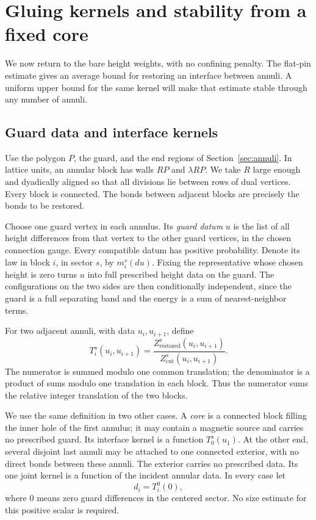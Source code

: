 \section{Gluing kernels and stability from a fixed core}\label{sec:kernels}

We now return to the bare height weights, with no confining penalty.
The flat-pin estimate gives an average bound for restoring an interface
between annuli. A uniform upper bound for the same kernel will make
that estimate stable through any number of annuli.

\subsection{Guard data and interface kernels}

Use the polygon \(P\), the guard, and the end regions of
Section~\ref{sec:annuli}. In lattice units, an annular block has walls
\(RP\) and \(\lambda RP\). We take \(R\) large enough and dyadically
aligned so that all divisions lie between rows of dual vertices.
Every block is connected. The bonds between adjacent blocks are
precisely the bonds to be restored.

Choose one guard vertex in each annulus. Its \emph{guard datum}
\(u\) is the list of all height differences from that vertex to the
other guard vertices, in the chosen connection gauge. Every
compatible datum has positive probability. Denote its law in block
\(i\), in sector \(s\), by \(m_i^s(du)\). Fixing the representative
whose chosen height is zero turns \(u\) into full prescribed height
data on the guard. The configurations on the two sides are then
conditionally independent, since the guard is a full separating
band and the energy is a sum of nearest-neighbor terms.

For two adjacent annuli, with data \(u_i,u_{i+1}\), define
\[
 T_i^s(u_i,u_{i+1})
   =\frac{Z_{\mathrm{restored}}^s(u_i,u_{i+1})}
           {Z_{\mathrm{cut}}^s(u_i,u_{i+1})}.
\]
The numerator is summed modulo one common translation; the
denominator is a product of sums modulo one translation in each
block. Thus the numerator sums the relative integer translation
of the two blocks.

We use the same definition in two other cases. A \emph{core} is
a connected block filling the inner hole of the first annulus;
it may contain a magnetic source and carries no prescribed guard.
Its interface kernel is a function \(T_0^s(u_1)\). At the other
end, several disjoint last annuli may be attached to one connected
exterior, with no direct bonds between these annuli. The exterior
carries no prescribed data. Its one joint kernel is a function of
the incident annular data. In every case let
\[
 d_i=T_i^0(0),
\]
where \(0\) means zero guard differences in the centered sector.
No size estimate for this positive scalar is required.

